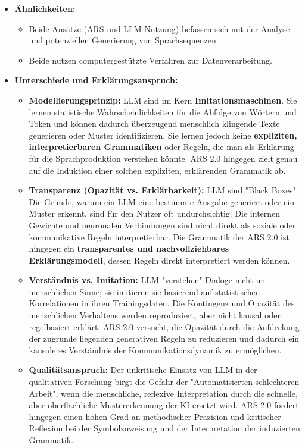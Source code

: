 \documentclass{article}
\begin{document}
\begin{itemize}
    \item \textbf{Ähnlichkeiten:}
    \begin{itemize}
        \item Beide Ansätze (ARS und LLM-Nutzung) befassen sich mit der Analyse und potenziellen Generierung von Sprachsequenzen.
        \item Beide nutzen computergestützte Verfahren zur Datenverarbeitung.
    \end{itemize}
    \item \textbf{Unterschiede und Erklärungsanspruch:}
    \begin{itemize}
        \item \textbf{Modellierungsprinzip:} LLM sind im Kern \textbf{Imitationsmaschinen}. Sie lernen statistische Wahrscheinlichkeiten für die Abfolge von Wörtern und Token und können dadurch überzeugend menschlich klingende Texte generieren oder Muster identifizieren. Sie lernen jedoch keine \textbf{expliziten, interpretierbaren Grammatiken} oder Regeln, die man als Erklärung für die Sprachproduktion verstehen könnte. ARS 2.0 hingegen zielt genau auf die Induktion einer solchen expliziten, erklärenden Grammatik ab.
        \item \textbf{Transparenz (Opazität vs. Erklärbarkeit):} LLM sind "Black Boxes". Die Gründe, warum ein LLM eine bestimmte Ausgabe generiert oder ein Muster erkennt, sind für den Nutzer oft undurchsichtig. Die internen Gewichte und neuronalen Verbindungen sind nicht direkt als soziale oder kommunikative Regeln interpretierbar. Die Grammatik der ARS 2.0 ist hingegen ein \textbf{transparentes und nachvollziehbares Erklärungsmodell}, dessen Regeln direkt interpretiert werden können.
        \item \textbf{Verständnis vs. Imitation:} LLM "verstehen" Dialoge nicht im menschlichen Sinne; sie imitieren sie basierend auf statistischen Korrelationen in ihren Trainingsdaten. Die Kontingenz und Opazität des menschlichen Verhaltens werden reproduziert, aber nicht kausal oder regelbasiert erklärt. ARS 2.0 versucht, die Opazität durch die Aufdeckung der zugrunde liegenden generativen Regeln zu reduzieren und dadurch ein kausaleres Verständnis der Kommunikationsdynamik zu ermöglichen.
        \item \textbf{Qualitätsanspruch:} Der unkritische Einsatz von LLM in der qualitativen Forschung birgt die Gefahr der "Automatisierten schlechteren Arbeit", wenn die menschliche, reflexive Interpretation durch die schnelle, aber oberflächliche Mustererkennung der KI ersetzt wird. ARS 2.0 fordert hingegen einen hohen Grad an methodischer Präzision und kritischer Reflexion bei der Symbolzuweisung und der Interpretation der induzierten Grammatik.
    \end{itemize}
\end{itemize}
\end{document}
